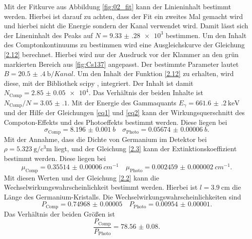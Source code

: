 Mit der Fitkurve aus Abbildung \ref{fig:02_fit} kann der Linieninhalt bestimmt werden. Hierbei ist darauf zu achten, dass der Fit ein zweites Mal gemacht wird 
und hierbei nicht die Energie sondern der Kanal verwendet wird. Damit lässt sich der Lineninhalt des Peaks auf $N=\num{9.33(28)e3}$ bestimmen.
Um den Inhalt des Comptonkontinuums zu bestimmen wird eine Ausgleichskurve der Gleichung \ref{2.12} berechnet.
Hierbei wird nur der Ausdruck vor der Klammer an den grün markierten Bereich aus \ref{fig:Cs137} angepasst.
Der bestimmte Parameter lautet $B=\SI{20.5(4)}{\barn\per Kanal}$. Um den Inhalt der Funktion \ref{2.12} zu erhalten,
wird diese,  mit der Bibliothek scipy \cite{scipy}, integriert. Der Inhalt ist damit $N_{\text{Comp}} = \num{2.85(5)e4}$.
Das Verhältnis der beiden Inhalte ist $N_{\text{Comp}}/N=\num{3.05(10)}$.
Mit der Energie des Gammaquants $E_{\gamma}=\SI{661.6(2)}{\kilo\eV}$ und der Hilfe der Gleichungen \eqref{eq1} und 
\eqref{eq2} kann der Wirkungsquerschnitt des Compoton-Effekts und des Photoeffekts bestimmt werden.
Diese liegen bei 
\begin{equation*}
  \sigma_{\text{Comp}}=\SI{8.196(1)}{b} \quad \sigma_{\text{Photo}}=\SI{0.05674(6)}{b}.
\end{equation*} 
Mit der Annahme, dass die Dichte von Germanium im Detektor bei $\rho = \SI{5.323}{\gram\per\cubic\centi\meter}$ \cite{Germanium_rho} liegt, und der
Gleichung \eqref{2.3} kann der Extinktionskoeffizient bestimmt werden.
Diese liegen bei 
\begin{equation*}
  \mu_{\text{Comp}} = \SI{0.35514(6)}{cm^{-1}} \quad \mu_{\text{Photo}} = \SI{0.002459(2)}{cm^{-1}}.
\end{equation*}
Mit diesen Werten und der Gleichung \eqref{2.2} kann die Wechselwirkungswahrscheinlichkeit bestimmt werden.
Hierbei ist $l=\SI{3.9}{\centi\meter}$ die Länge des Germanium-Kristalls.
Die Wechselwirkungswahrscheinlichkeiten sind 
\begin{equation*}
  P_{\text{Comp}} = \num{0.74968(5)}\quad P_{\text{Photo}} = \num{0.00954(1)}.
\end{equation*}
Das Verhältnis der beiden Größen ist
\begin{equation*}
  \frac{P_{\text{Comp}} }{P_{\text{Photo}}} = \num{78.56(8)}.
\end{equation*}


